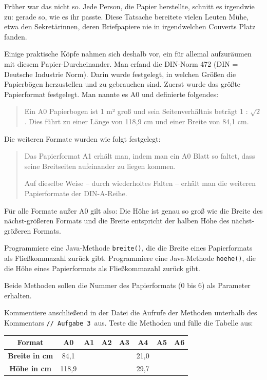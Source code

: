Früher war das nicht so. Jede Person, die Papier herstellte, schnitt es
irgendwie zu: gerade so, wie es ihr passte. Diese Tatsache bereitete vielen
Leuten Mühe, etwa den Sekretärinnen, deren Briefpapiere nie in irgendwelchen
Couverts Platz fanden.

Einige praktische Köpfe nahmen sich deshalb vor, ein für allemal aufzuräumen
mit diesem Papier-Durcheinander. Man erfand die DIN-Norm 472 (DIN = Deutsche
Industrie Norm). Darin wurde festgelegt, in welchen Größen die Papierbögen
herzustellen und zu gebrauchen sind. Zuerst wurde das größte Papierformat
festgelegt. Man nannte es A0 und definierte folgendes:

\begin{quotation}
\noindent Ein A0 Papierbogen ist 1 m² groß und sein Seitenverhältnis beträgt 1 :
$\sqrt{2}$. Dies führt zu einer Länge von 118,9 cm und einer Breite von 84,1
cm.
\end{quotation}

Die weiteren Formate wurden wie folgt festgelegt:

\begin{quotation}
\noindent Das Papierformat A1 erhält man, indem man ein A0 Blatt so faltet, dass
seine Breitseiten aufeinander zu liegen kommen.

\vspace{3mm}

\noindent Auf dieselbe Weise -- durch wiederholtes Falten -- erhält man die
weiteren Papierformate der DIN-A-Reihe.
\end{quotation}

Für alle Formate außer A0 gilt also: 
Die Höhe ist genau so groß wie die Breite des nächst-größeren Formats und die
Breite entspricht der halben Höhe des nächst-größeren Formats.

Programmiere eine Java-Methode \lstinline|breite()|, die die Breite eines
Papierformats als Fließkommazahl zurück gibt. Programmiere eine Java-Methode
\lstinline|hoehe()|, die die Höhe eines Papierformats als Fließkommazahl zurück
gibt.

Beide Methoden sollen die Nummer des Papierformats (0 bis 6) als Parameter erhalten.

Kommentiere anschließend in der Datei die Aufrufe der Methoden unterhalb des
Kommentars \glqq\lstinline|// Aufgabe 3|\grqq\ aus. Teste die Methoden und fülle
die Tabelle aus:

\bgroup
\def\arraystretch{1.2}
\begin{tabular}{|c|c|c|c|c|c|c|c|}\hline
\textbf{Format}       & \textbf{A0} & \textbf{A1} & \textbf{A2} & \textbf{A3} & \textbf{A4} & \textbf{A5} & \textbf{A6} \\ \hline
\textbf{Breite in cm} &  84,1 &  &  &  & 21,0 & & \\ \hline
\textbf{Höhe in cm}   & 118,9 &  &  &  & 29,7 & & \\ \hline
\end{tabular}
\egroup


